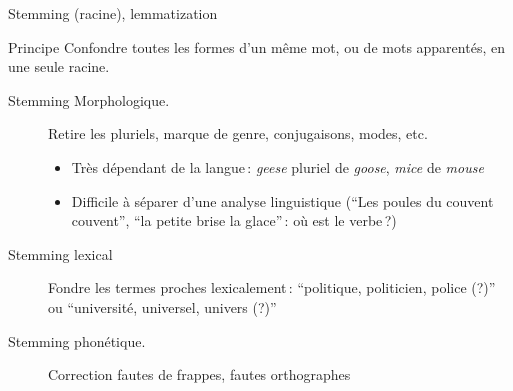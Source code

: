 \begin{frame}{Stemming (racine), lemmatization}
\begin{beamerboxesrounded}{Principe}
\alert{Confondre} toutes les formes d'un même mot, ou de mots apparentés, en
une seule \alert{racine}.
\end{beamerboxesrounded}

\smallskip

\begin{description}

\item[Stemming Morphologique.] Retire les pluriels, marque de genre, conjugaisons, modes, etc.

\begin{itemize}

\item Très dépendant de la langue\,: \emph{geese} pluriel de \emph{goose}, \emph{mice} de \emph{mouse}

\item Difficile à séparer d'une analyse linguistique (``Les poules du couvent couvent'', ``la petite
    brise la glace''\,:  où est le verbe\,?)
\end{itemize}

\item[Stemming lexical] Fondre les termes proches lexicalement\,: ``politique, politicien, police (?)'' ou 
     ``université, universel, univers (?)'' 


\item[Stemming phonétique.]  Correction fautes de frappes, fautes orthographes

\end{description}


\end{frame}

